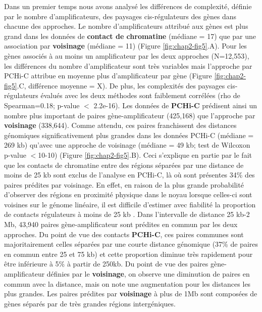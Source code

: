 Dans un premier temps nous avons analysé les différences de complexité, définie par le nombre d’amplificateurs, des paysages \gls{cis}-régulateurs des gènes dans chacune des approches. Le nombre d’amplificateurs attribué aux gènes est plus grand dans les données de \textbf{contact de chromatine} (médiane = 17) que par une association par \textbf{voisinage} (médiane = 11) (Figure \ref{fig:chap2-fig5}.A). Pour les gènes associés à au moins un amplificateur par les deux approches (N=12,553), les différences du nombre d’amplificateur sont très variables mais l’approche par \gls{PCHi-C} attribue en moyenne plus d’amplificateur par gène (Figure \ref{fig:chap2-fig5}.C, différence moyenne = X). De plus, les complexités des paysages \gls{cis}-régulateurs évalués avec les deux méthodes sont faiblement corrélées (rho de Spearman=0.18; p-value $<$ 2.2e-16). Les données de \textbf{\gls{PCHi-C}} prédisent ainsi un nombre plus important de paires gène-amplificateur (425,168) que l’approche par \textbf{voisinage} (338,644). Comme attendu, ces paires franchissent des distances génomiques significativement plus grandes dans les données \gls{PCHi-C} (médiane = 269 kb) qu’avec une approche de voisinage (médiane = 49 kb; test de Wilcoxon p-value $<$10-10) (Figure \ref{fig:chap2-fig5}.B). Ceci s’explique en partie par le fait que les contacts de chromatine entre des régions séparées par une distance de moins de 25 kb sont exclus de l’analyse en \gls{PCHi-C}, là où sont présentes 34\% des paires prédites par voisinage. En effet, en raison de la plus grande probabilité d’observer des régions en proximité physique dans le noyau lorsque celles-ci sont voisines sur le génome linéaire, il est difficile d’estimer avec fiabilité la proportion de contacts régulateurs à moins de 25 kb \citep{cairns_chicago:_2016}. Dans l’intervalle de distance 25 kb-2 Mb, 43,940 paires gène-amplificateur sont prédites en commun par les deux approches. Du point de vue des contacts \textbf{\gls{PCHi-C}}, ces paires communes sont majoritairement celles séparées par une courte distance génomique (37\% de paires en commun entre 25 et 75 kb) et cette proportion diminue très rapidement pour être inférieure à 5\% à partir de 250kb. Du point de vue des paires gène-amplificateur définies par le \textbf{voisinage}, on observe une diminution de paires en commun avec la distance, mais on note une augmentation pour les distances les plus grandes. Les paires prédites par \textbf{voisinage} à plus de 1Mb sont composées de gènes séparés par de très grandes régions intergéniques.\\


